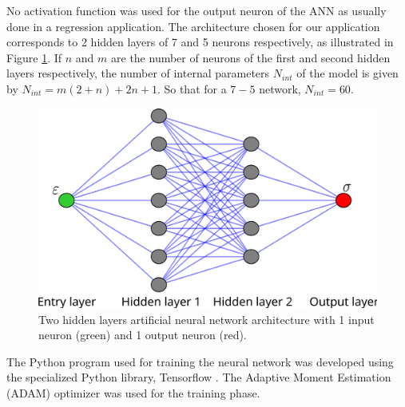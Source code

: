 \documentclass[metals,article,submit,pdftex,moreauthors]{Definitions/mdpi}
\begin{document}
No activation function was used for the output neuron of the ANN as usually done in a regression application.
The architecture chosen for our application corresponds to 2 hidden layers of 7 and 5 neurons respectively, as illustrated in Figure \ref{fig:ANN-7-5}.
If $n$ and $m$ are the number of neurons of the first and second hidden layers respectively, the number of internal parameters $N_{int}$ of the model is given by $N_{int}=m(2+n)+2n+1$.
So that for a $7-5$ network, $N_{int}=60$.
\begin{figure}[H]
\centering
\includegraphics[width=0.7\columnwidth]{Figures/ANN-7-5}
\caption{Two hidden layers artificial neural network architecture with 1 input neuron (green) and 1 output neuron (red).}
\label{fig:ANN-7-5}
\end{figure}
The Python program used for training the neural network was developed using the specialized Python library, Tensorflow \cite{Abadi-2016}.
The Adaptive Moment Estimation (ADAM) optimizer \cite{Kingma-2015} was used for the training phase.

\end{document}
